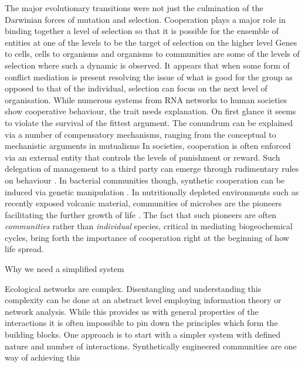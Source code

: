 The major evolutionary transitions were not just the culmination of the Darwinian forces of mutation and selection. 
Cooperation plays a major role in binding together a level of selection so that it is possible for the ensemble of entities at one of the levels to be the target of selection on the higher level %
Genes to cells, cells to organisms and organisms to communities are some of the levels of selection where such a dynamic is observed.
It appears that when some form of conflict mediation is present resolving the issue of what is good for the group as opposed to that of the individual, selection can focus on the next level of organisation.
While numerous systems from RNA networks to human societies show cooperative behaviour, the trait needs explanation.
On first glance it seems to violate the survival of the fittest argument.
The conundrum can be explained via a number of compensatory mechanisms, ranging from the conceptual %
to mechanistic arguments in mutualisms %
In societies, cooperation is often enforced via an external entity that controls the levels of punishment or reward. 
Such delegation of management to a third party can emerge through rudimentary rules on behaviour \citep{sigmund:Nature:2010}.
In bacterial communities though, synthetic cooperation can be induced via genetic manipulation \citep{shou:elife:2015,campbell:elife:2015}.
In nutritionally depleted environments such as recently exposed volcanic material, communities of microbes are the pioneers facilitating the further growth of life \citep{kelly:MicEco:2014,fujimura:SciRep:2016}.
The fact that such pioneers are often \textit{communities} rather than \textit{individual} species,  critical in mediating biogeochemical cycles, bring forth the importance of cooperation right at the beginning of how life spread.

Why we need a simplified system

Ecological networks are complex.
Disentangling and understanding this complexity can be done at an abstract level employing information theory or network analysis.
While this provides us with general properties of the interactions it is often impossible to pin down the principles which form the building blocks.
One approach is to start with a simpler system with defined nature and number of interactions.
Synthetically engineered communities are one way of achieving this \citep{momeni:elife:2013}